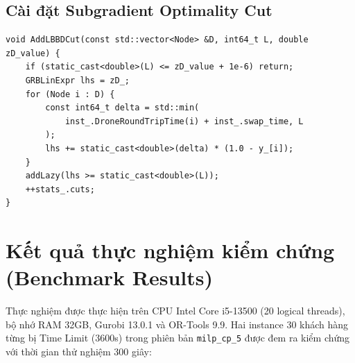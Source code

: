 \documentclass[12pt,a4paper]{article}
\begin{document}
\subsection{Cài đặt Subgradient Optimality Cut}

\begin{verbatim}
void AddLBBDCut(const std::vector<Node> &D, int64_t L, double zD_value) {
    if (static_cast<double>(L) <= zD_value + 1e-6) return;
    GRBLinExpr lhs = zD_;
    for (Node i : D) {
        const int64_t delta = std::min(
            inst_.DroneRoundTripTime(i) + inst_.swap_time, L
        );
        lhs += static_cast<double>(delta) * (1.0 - y_[i]);
    }
    addLazy(lhs >= static_cast<double>(L));
    ++stats_.cuts;
}
\end{verbatim}

\section{Kết quả thực nghiệm kiểm chứng (Benchmark Results)}
\label{sec:benchmark-results}

Thực nghiệm được thực hiện trên CPU Intel Core i5-13500 (20 logical threads), bộ nhớ RAM 32GB, Gurobi 13.0.1 và OR-Tools 9.9. Hai instance 30 khách hàng từng bị Time Limit (3600s) trong phiên bản \texttt{milp\_cp\_5} được đem ra kiểm chứng với thời gian thử nghiệm 300 giây:
\end{document}
